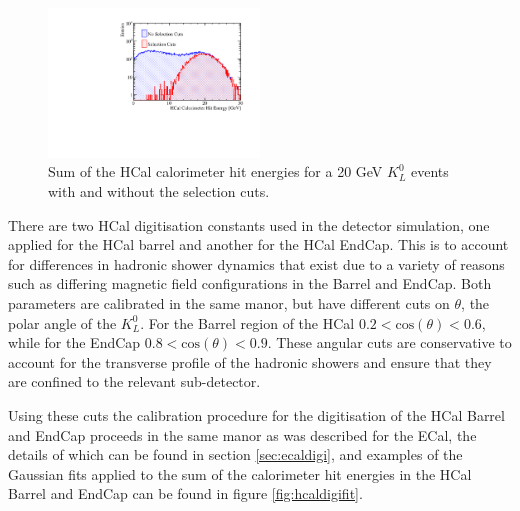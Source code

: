 \begin{figure}
\includegraphics[width=0.5\textwidth]{EnergyEstimators/Plots/Calibration/Digitsation/HCal/DigitisationHCalSelection.pdf}
\caption[Sum of the HCal calorimeter hit energies for a 20 GeV $K^{0}_{L}$ events with and without the selection cuts.]{Sum of the HCal calorimeter hit energies for a 20 GeV $K^{0}_{L}$ events with and without the selection cuts.}
\label{fig:hcaldigiselection}
\end{figure}

There are two HCal digitisation constants used in the detector simulation, one applied for the HCal barrel and another for the HCal EndCap.  This is to account for differences in hadronic shower dynamics that exist due to a variety of reasons such as differing magnetic field configurations in the Barrel and EndCap.  Both parameters are calibrated in the same manor, but have different cuts on $\theta$, the polar angle of the $K^{0}_{L}$.  For the Barrel region of the HCal $0.2 < \text{cos}(\theta) < 0.6$, while for the EndCap $0.8 < \text{cos}(\theta) < 0.9$.  These angular cuts are conservative to account for the transverse profile of the hadronic showers and ensure that they are confined to the relevant sub-detector.

Using these cuts the calibration procedure for the digitisation of the HCal Barrel and EndCap proceeds in the same manor as was described for the ECal, the details of which can be found in section \ref{sec:ecaldigi}, and examples of the Gaussian fits applied to the sum of the calorimeter hit energies in the HCal Barrel and EndCap can be found in figure \ref{fig:hcaldigifit}. 

